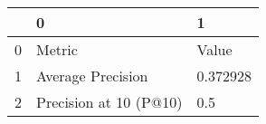 \begin{tabular}{lll}
\toprule
{} &                       0 &         1 \\
\midrule
0 &                  Metric &     Value \\
1 &       Average Precision &  0.372928 \\
2 &  Precision at 10 (P@10) &       0.5 \\
\bottomrule
\end{tabular}
